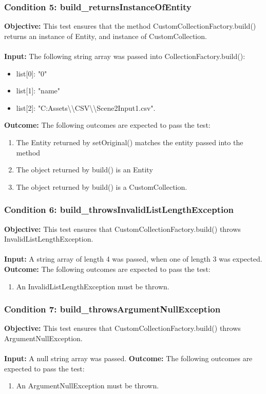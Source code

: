 \documentclass[a4paper,12pt]{article}
\begin{document}
		\subsubsection{Condition 5: build\_returnsInstanceOfEntity}
			\textbf{Objective:} This test ensures that the method CustomCollectionFactory.build() returns an instance of Entity, and instance of CustomCollection.\\\\
			\textbf{Input:} The following string array was passed into CollectionFactory.build():
				\begin{itemize}
					\item list[0]: "0"
					\item list[1]: "name"
					\item list[2]: "C:Assets\textbackslash \textbackslash CSV\textbackslash \textbackslash Scene2Input1.csv".
				\end{itemize}
			\textbf{Outcome:} The following outcomes are expected to pass the test:
				\begin{enumerate}
					\item The Entity returned by setOriginal() matches the entity passed into the method
					\item The object returned by build() is an Entity
					\item The object returned by build() is a CustomCollection.
				\end{enumerate}
		\subsubsection{Condition 6: build\_throwsInvalidListLengthException}
			\textbf{Objective:} This test ensures that CustomCollectionFactory.build() throws InvalidListLengthException.\\\\
			\textbf{Input:} A string array of length 4 was passed, when one of length 3 was expected.
			\textbf{Outcome:} The following outcomes are expected to pass the test:
				\begin{enumerate}
					\item An InvalidListLengthException must be thrown.
				\end{enumerate}
		\subsubsection{Condition 7: build\_throwsArgumentNullException}
			\textbf{Objective:} This test ensures that CustomCollectionFactory.build() throws ArgumentNullException.\\\\
			\textbf{Input:} A null string array was passed.
			\textbf{Outcome:} The following outcomes are expected to pass the test:
				\begin{enumerate}
					\item An ArgumentNullException must be thrown.
				\end{enumerate}
\end{document}
